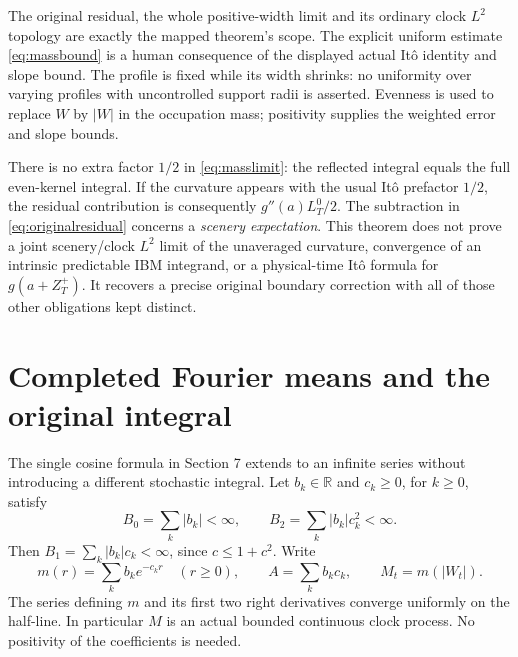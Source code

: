 \documentclass[11pt]{article}
\newcommand{\R}{\mathbb R}
\begin{document}
The original residual, the whole positive-width limit and its ordinary
clock $L^2$ topology are exactly the mapped theorem's scope. The
explicit uniform estimate \eqref{eq:massbound} is a human
consequence of the displayed actual It\^o identity and slope bound.
The profile is fixed while its width shrinks: no uniformity over
varying profiles with uncontrolled support radii is asserted.
Evenness is used to replace $W$ by $|W|$ in the occupation mass;
positivity supplies the weighted error and slope bounds.

There is no extra factor $1/2$ in \eqref{eq:masslimit}: the
reflected integral equals the full even-kernel integral. If the
curvature appears with the usual It\^o prefactor $1/2$, the
residual contribution is consequently $g''(a)L_T^0/2$.
The subtraction in \eqref{eq:originalresidual} concerns a
\emph{scenery expectation}. This theorem does not prove a joint
scenery/clock $L^2$ limit of the unaveraged curvature, convergence
of an intrinsic predictable IBM integrand, or a physical-time
It\^o formula for $g(a+Z_T^+)$. It recovers a precise original
boundary correction with all of those other obligations kept distinct.


\section{Completed Fourier means and the original integral}
The single cosine formula in Section 7 extends to an infinite series
without introducing a different stochastic integral. Let $b_k\in\R$
and $c_k\geq0$, for $k\geq0$, satisfy
\begin{equation}\label{eq:seriescost}
 B_0=\sum_k|b_k|<\infty,\qquad
 B_2=\sum_k|b_k|c_k^2<\infty.
\end{equation}
Then $B_1=\sum_k|b_k|c_k<\infty$, since $c\leq1+c^2$.
Write
\[
 m(r)=\sum_k b_ke^{-c_kr}\quad(r\geq0),\qquad
 A=\sum_k b_kc_k,\qquad M_t=m(|W_t|).
\]
The series defining $m$ and its first two right derivatives converge
uniformly on the half-line. In particular $M$ is an actual bounded
continuous clock process. No positivity of the coefficients is needed.
\end{document}

